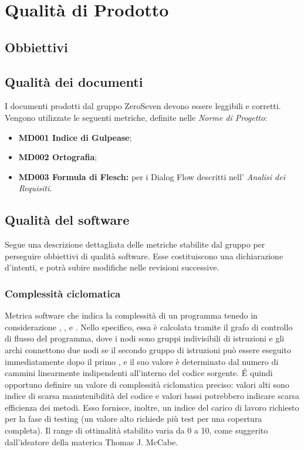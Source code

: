 \chapter{Qualità di Prodotto}
\section{Obbiettivi}


\section{Qualità dei documenti}
I documenti prodotti dal gruppo ZeroSeven devono essere leggibili e corretti. Vengono utilizzate le seguenti metriche, definite nelle \textit{Norme di Progetto}:
\begin{itemize}
    \item \textbf{MD001 Indice di Gulpease};
    \item \textbf{MD002 Ortografia};
    \item \textbf{MD003 Formula di Flesch:} per i Dialog Flow descritti nell' \textit{Analisi dei Requisiti}.
\end{itemize}

\section{Qualità del software}
Segue una descrizione dettagliata delle metriche stabilite dal gruppo per perseguire obbiettivi di qualità software. \newline
Esse costituiscono una dichiarazione d'intenti, e potrà subire modifiche nelle revisioni successive.
\subsection{Complessità ciclomatica}
Metrica software che indica la complessità di un programma tenedo in considerazione , ,  e .
Nello specifico, essa è calcolata tramite il grafo di controllo di flusso del programma, dove i nodi sono gruppi indivisibili di istruzioni e gli archi connettono due nodi se il secondo gruppo di istruzioni può essere eseguito immediatamente dopo il primo , e il suo valore è determinato dal numero di cammini linearmente indipendenti all'interno del codice sorgente. 
\'E quindi opportuno definire un valore di complessità ciclomatica preciso: valori alti sono indice di scarsa manutenibilità del codice e valori bassi potrebbero indicare scarsa efficienza dei metodi.
Esso fornisce, inoltre, un indice del carico di lavoro richiesto per la fase di testing (un valore alto richiede più test per una copertura completa).
Il range di ottimalità stabilito varia da 0 a 10, come suggerito dall'ideatore della materica Thomas J. McCabe.  





